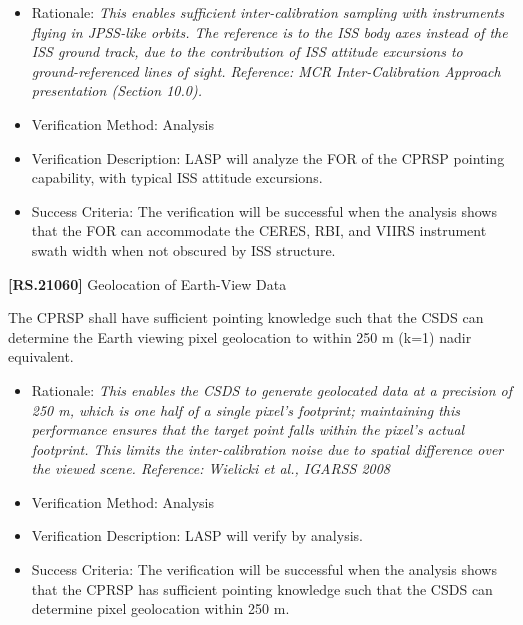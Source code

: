 \begin{itemize}
\item{} Rationale: \emph{This enables sufficient inter-calibration sampling with instruments flying in JPSS-like orbits. The reference is to the ISS body axes instead of the ISS ground track, due to the contribution of ISS attitude excursions to ground-referenced lines of sight. Reference: MCR Inter-Calibration Approach presentation (Section 10.0).}

\item{} Verification Method: Analysis

\item{} Verification Description: \gls{LASP} will analyze the FOR of the \gls{CPRSP} \gls{point}ing capability, with typical \gls{ISS} attitude excursions.

\item{} Success Criteria: The verification will be successful when the \gls{analysis} shows that the FOR can accommodate the \gls{CERES}, \gls{RBI}, and \gls{VIIRS} instrument swath width when not obscured by \gls{ISS} structure.

\end{itemize}

\textbf{[RS.21060]} Geolocation of Earth-View Data

The \gls{CPRSP} shall have sufficient \gls{point}ing knowledge such that the \gls{CSDS} can determine the Earth viewing pixel geolocation to within 250 m (k=1) nadir equivalent.

\begin{itemize}
\item{} Rationale: \emph{This enables the CSDS to generate geolocated data at a precision of 250 m, which is one half of a single pixel's footprint; maintaining this performance ensures that the target point falls within the pixel's actual footprint. This limits the inter-calibration noise due to spatial difference over the viewed scene. Reference: Wielicki et al., IGARSS 2008}

\item{} Verification Method: Analysis

\item{} Verification Description: \gls{LASP} will verify by \gls{analysis}.

\item{} Success Criteria: The verification will be successful when the \gls{analysis} shows that the \gls{CPRSP} has sufficient \gls{point}ing knowledge such that the \gls{CSDS} can determine pixel geolocation within 250 m.

\end{itemize}

